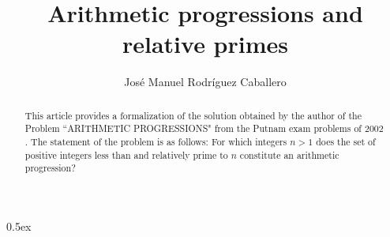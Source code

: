 \documentclass[11pt,a4paper]{article}
\begin{document}
\title{Arithmetic progressions and relative primes}
\author{Jos\'e Manuel Rodr\'iguez Caballero}
\maketitle

\begin{abstract}
This article provides a formalization of the solution obtained by the author of the Problem ``ARITHMETIC PROGRESSIONS" from the 
Putnam exam problems \cite{putnam} of $2002$. The statement of the problem is as follows: For which integers $n>1$ does the set of positive
 integers less than and relatively prime to $n$ constitute an arithmetic progression?
\end{abstract}

\tableofcontents
\newpage
\parindent 0pt\parskip 0.5ex





\end{document}
